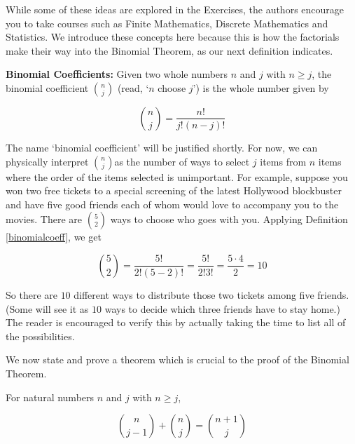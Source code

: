 \documentclass{ximera}
\begin{document}
\smallskip

 While some of these ideas are explored in the Exercises, the authors encourage you to take courses such as Finite Mathematics, Discrete Mathematics and Statistics. We introduce these concepts here because this is how the factorials make their way into the Binomial Theorem, as our next definition indicates.

\smallskip

\colorbox{ResultColor}{\bbm

\begin{definition} \label{binomialcoeff}  \textbf{Binomial Coefficients:}  Given two whole numbers $n$ and $j$ with $n \geq j$, the  binomial coefficient  {\boldmath $\displaystyle \binom{n}{j}$} (read, `$n$ choose $j$') is the whole number given by

\[ \binom{n}{j} = \dfrac{n!}{j! (n-j)!} \]

\end{definition}
\ebm}

\smallskip
 
The name `binomial coefficient' will be justified shortly.  For now, we can physically interpret $\binom{n}{j}$as the number of ways to select $j$ items from $n$ items where the order of the items selected is unimportant.   For example, suppose you won two free tickets to a special screening of the latest Hollywood blockbuster and have five good friends each of whom would love to accompany you to the movies.  There are $\binom{5}{2}$ ways to choose who goes with you.  Applying Definition \ref{binomialcoeff}, we get

\[ \binom{5}{2} = \dfrac{5!}{2! (5-2)!} = \dfrac{5!}{2! 3!} = \dfrac{5 \cdot 4}{2} = 10\] 

So there are $10$ different ways to distribute those two tickets among five friends. (Some will see it as $10$ ways to decide which three friends have to stay home.)  The reader is encouraged to verify this by actually taking the time to list all of the possibilities.  

\smallskip



We now state and prove a theorem which is crucial to the proof of the Binomial Theorem.

\smallskip

\colorbox{ResultColor}{\bbm

\begin{theorem}  \label{addbinomcoeff}  For natural numbers $n$ and $j$ with $n \geq j$, 

\[ \binom{n}{j-1} + \binom{n}{j} = \binom{n+1}{j} \]



\end{theorem}

\ebm}
\end{document}
